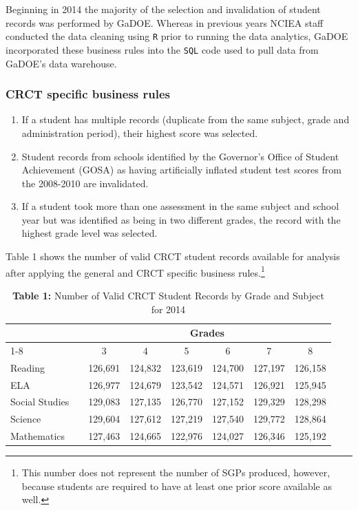 \documentclass[12pt]{article}
\begin{document}
Beginning in 2014 the majority of the selection and invalidation of
student records was performed by GaDOE. Whereas in previous years NCIEA
staff conducted the data cleaning using \texttt{R} prior to running the
data analytics, GaDOE incorporated these business rules into the
\texttt{SQL} code used to pull data from GaDOE's data warehouse.

\subsubsection{CRCT specific business
rules}\label{crct-specific-business-rules}

\begin{enumerate}
\def\labelenumi{\arabic{enumi}.}
\itemsep1pt\parskip0pt
\item
  If a student has multiple records (duplicate from the same subject,
  grade and administration period), their highest score was selected.
\item
  Student records from schools identified by the Governor's Office of
  Student Achievement (GOSA) as having artificially inflated student
  test scores from the 2008-2010 are invalidated.
\item
  If a student took more than one assessment in the same subject and
  school year but was identified as being in two different grades, the
  record with the highest grade level was selected.
\end{enumerate}

Table 1 shows the number of valid CRCT student records available for
analysis after applying the general and CRCT specific business
rules.\footnote{This number does not represent the number of SGPs
  produced, however, because students are required to have at least one
  prior score available as well.}

\begin{table}[H]
\caption*{\textbf{Table 1:} Number of Valid CRCT Student Records by Grade and Subject for 2014\label{table1}} 
\begin{center}
\begin{tabular}{lcllllll}
\hline\hline
\multicolumn{1}{c}{\bfseries }&\multicolumn{1}{c}{\bfseries }&\multicolumn{6}{c}{\bfseries Grades}\tabularnewline
\cline{1-8}
\multicolumn{1}{c}{Content Area}&\multicolumn{1}{c}{}&\multicolumn{1}{c}{3}&\multicolumn{1}{c}{4}&\multicolumn{1}{c}{5}&\multicolumn{1}{c}{6}&\multicolumn{1}{c}{7}&\multicolumn{1}{c}{8}\tabularnewline
\hline
Reading&&126,691&124,832&123,619&124,700&127,197&126,158\tabularnewline
ELA&&126,977&124,679&123,542&124,571&126,921&125,945\tabularnewline
Social Studies&&129,083&127,135&126,770&127,152&129,329&128,298\tabularnewline
Science&&129,604&127,612&127,219&127,540&129,772&128,864\tabularnewline
Mathematics&&127,463&124,665&122,976&124,027&126,346&125,192\tabularnewline
\hline
\end{tabular}\end{center}

\end{table}
\end{document}
